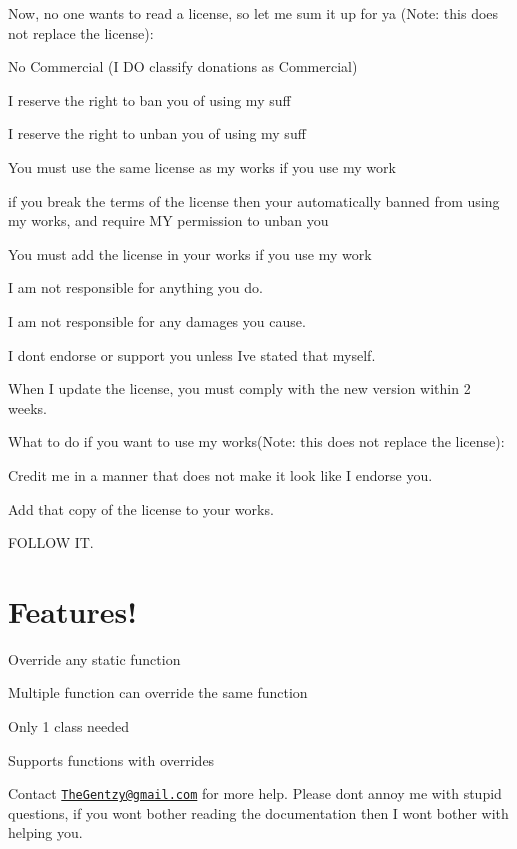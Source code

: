 \begin{DoxyItemize}
\item Now, no one wants to read a license, so let me sum it up for ya (Note\+: this does not replace the license)\+:
\begin{DoxyItemize}
\item No Commercial (I DO classify donations as Commercial)
\item I reserve the right to ban you of using my suff
\item I reserve the right to unban you of using my suff
\item You must use the same license as my works if you use my work
\item if you break the terms of the license then your automatically banned from using my works, and require MY permission to unban you
\item You must add the license in your works if you use my work
\item I am not responsible for anything you do.
\item I am not responsible for any damages you cause.
\item I don\textquotesingle{}t endorse or support you unless I\textquotesingle{}ve stated that myself.
\item When I update the license, you must comply with the new version within 2 weeks.
\end{DoxyItemize}
\item What to do if you want to use my works(\+Note\+: this does not replace the license)\+:
\begin{DoxyItemize}
\item Credit me in a manner that does not make it look like I endorse you.
\item Add that copy of the license to your works.
\item F\+O\+L\+L\+OW IT.
\end{DoxyItemize}
\end{DoxyItemize}\hypertarget{index_Features_sec}{}\section{Features!}\label{index_Features_sec}

\begin{DoxyItemize}
\item Override any static function
\item Multiple function can override the same function
\item Only 1 class needed
\item Supports functions with overrides
\end{DoxyItemize}

Contact \href{mailto:TheGentzy@gmail.com}{\tt The\+Gentzy@gmail.\+com} for more help. Please don\textquotesingle{}t annoy me with stupid questions, if you won\textquotesingle{}t bother reading the documentation then I won\textquotesingle{}t bother with helping you. 
